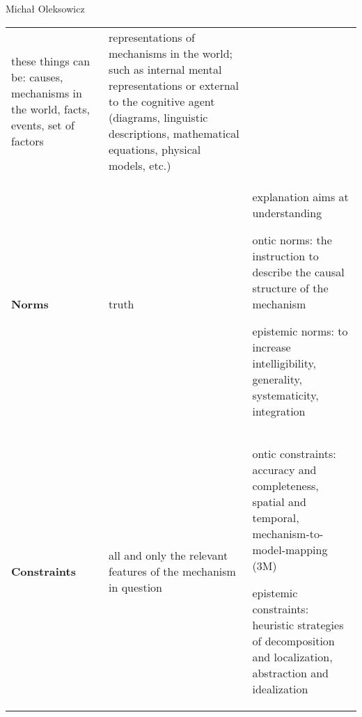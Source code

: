 \begin{artengenv}{Michał Oleksowicz}
\begin{table}[H]
{\begin{tabular}{@{}p{1.9cm}p{3.8cm}p{5.5cm}@{}}
these things can be: causes, mechanisms in the world, facts, events, set of factors &
representations of mechanisms in the world; such as internal mental representations or external to the cognitive agent (diagrams, linguistic descriptions, mathematical equations, physical models, etc.)\\
 \rowcolor[HTML]{ECF4FF} 
{\bfseries Norms} &
truth &
explanation aims at understanding

ontic norms: the instruction to describe the causal structure of the mechanism

epistemic norms: to increase intelligibility, generality, systematicity, integration\\
  \rowcolor[HTML]{FFFFFF} 
{\bfseries Constraints} &
all and only the relevant features of the mechanism in question

&
ontic constraints: accuracy and completeness, spatial and temporal, mechanism-to-model-mapping (3M)

epistemic constraints: heuristic strategies of decomposition and localization, abstraction and idealization\\
\end{tabular}%
}
\end{table}







\end{artengenv}
